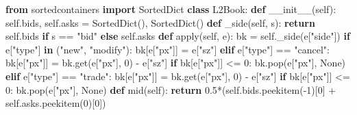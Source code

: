 \documentclass[
]{article}
\newenvironment{Shaded}{}{}
\newcommand{\BuiltInTok}[1]{\textcolor[rgb]{0.00,0.50,0.00}{#1}}
\newcommand{\ControlFlowTok}[1]{\textcolor[rgb]{0.00,0.44,0.13}{\textbf{#1}}}
\newcommand{\DecValTok}[1]{\textcolor[rgb]{0.25,0.63,0.44}{#1}}
\newcommand{\FloatTok}[1]{\textcolor[rgb]{0.25,0.63,0.44}{#1}}
\newcommand{\FunctionTok}[1]{\textcolor[rgb]{0.02,0.16,0.49}{#1}}
\newcommand{\ImportTok}[1]{\textcolor[rgb]{0.00,0.50,0.00}{\textbf{#1}}}
\newcommand{\KeywordTok}[1]{\textcolor[rgb]{0.00,0.44,0.13}{\textbf{#1}}}
\newcommand{\NormalTok}[1]{#1}
\newcommand{\OperatorTok}[1]{\textcolor[rgb]{0.40,0.40,0.40}{#1}}
\newcommand{\StringTok}[1]{\textcolor[rgb]{0.25,0.44,0.63}{#1}}
\newcommand{\VariableTok}[1]{\textcolor[rgb]{0.10,0.09,0.49}{#1}}
\begin{document}
\begin{Shaded}
\begin{Highlighting}[]
\ImportTok{from}\NormalTok{ sortedcontainers }\ImportTok{import}\NormalTok{ SortedDict}
\KeywordTok{class}\NormalTok{ L2Book:}
    \KeywordTok{def} \FunctionTok{\_\_init\_\_}\NormalTok{(}\VariableTok{self}\NormalTok{): }\VariableTok{self}\NormalTok{.bids, }\VariableTok{self}\NormalTok{.asks }\OperatorTok{=}\NormalTok{ SortedDict(), SortedDict()}
    \KeywordTok{def}\NormalTok{ \_side(}\VariableTok{self}\NormalTok{, s): }\ControlFlowTok{return} \VariableTok{self}\NormalTok{.bids }\ControlFlowTok{if}\NormalTok{ s }\OperatorTok{==} \StringTok{"bid"} \ControlFlowTok{else} \VariableTok{self}\NormalTok{.asks}
    \KeywordTok{def} \BuiltInTok{apply}\NormalTok{(}\VariableTok{self}\NormalTok{, e):}
\NormalTok{        bk }\OperatorTok{=} \VariableTok{self}\NormalTok{.\_side(e[}\StringTok{"side"}\NormalTok{])}
        \ControlFlowTok{if}\NormalTok{ e[}\StringTok{"type"}\NormalTok{] }\KeywordTok{in}\NormalTok{ (}\StringTok{"new"}\NormalTok{, }\StringTok{"modify"}\NormalTok{): bk[e[}\StringTok{"px"}\NormalTok{]] }\OperatorTok{=}\NormalTok{ e[}\StringTok{"sz"}\NormalTok{]}
        \ControlFlowTok{elif}\NormalTok{ e[}\StringTok{"type"}\NormalTok{] }\OperatorTok{==} \StringTok{"cancel"}\NormalTok{:}
\NormalTok{            bk[e[}\StringTok{"px"}\NormalTok{]] }\OperatorTok{=}\NormalTok{ bk.get(e[}\StringTok{"px"}\NormalTok{], }\DecValTok{0}\NormalTok{) }\OperatorTok{{-}}\NormalTok{ e[}\StringTok{"sz"}\NormalTok{]}
            \ControlFlowTok{if}\NormalTok{ bk[e[}\StringTok{"px"}\NormalTok{]] }\OperatorTok{\textless{}=} \DecValTok{0}\NormalTok{: bk.pop(e[}\StringTok{"px"}\NormalTok{], }\VariableTok{None}\NormalTok{)}
        \ControlFlowTok{elif}\NormalTok{ e[}\StringTok{"type"}\NormalTok{] }\OperatorTok{==} \StringTok{"trade"}\NormalTok{:}
\NormalTok{            bk[e[}\StringTok{"px"}\NormalTok{]] }\OperatorTok{=}\NormalTok{ bk.get(e[}\StringTok{"px"}\NormalTok{], }\DecValTok{0}\NormalTok{) }\OperatorTok{{-}}\NormalTok{ e[}\StringTok{"sz"}\NormalTok{]}
            \ControlFlowTok{if}\NormalTok{ bk[e[}\StringTok{"px"}\NormalTok{]] }\OperatorTok{\textless{}=} \DecValTok{0}\NormalTok{: bk.pop(e[}\StringTok{"px"}\NormalTok{], }\VariableTok{None}\NormalTok{)}
    \KeywordTok{def}\NormalTok{ mid(}\VariableTok{self}\NormalTok{):}
        \ControlFlowTok{return} \FloatTok{0.5}\OperatorTok{*}\NormalTok{(}\VariableTok{self}\NormalTok{.bids.peekitem(}\OperatorTok{{-}}\DecValTok{1}\NormalTok{)[}\DecValTok{0}\NormalTok{] }\OperatorTok{+} \VariableTok{self}\NormalTok{.asks.peekitem(}\DecValTok{0}\NormalTok{)[}\DecValTok{0}\NormalTok{])}
\end{Highlighting}
\end{Shaded}
\end{document}
